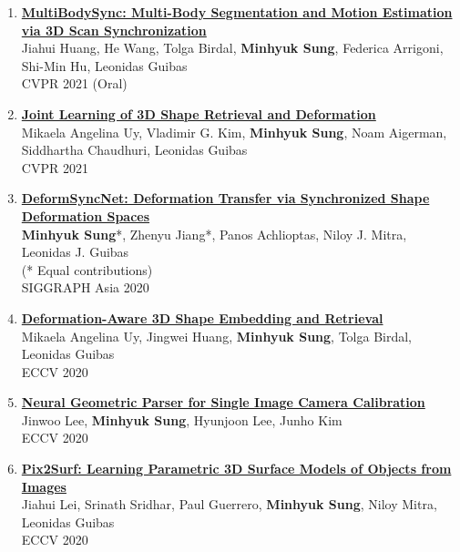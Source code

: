 \documentclass[letterpaper,10pt]{article} %
\newcommand{\blankline}{\quad\pagebreak[2]}
\begin{document}
{\begin{enumerate}
\item \label{cvpr21_2}
\href{https://cg.cs.tsinghua.edu.cn/people/~huangjh/publication/multibodysync/}{\textbf{MultiBodySync: Multi-Body Segmentation and Motion Estimation via 3D Scan Synchronization}}\\
Jiahui Huang, He Wang, Tolga Birdal, \textbf{Minhyuk Sung}, Federica Arrigoni, Shi-Min Hu, Leonidas Guibas\\
CVPR 2021 (Oral)\\
\blankline

\item \label{cvpr21_1}
\href{https://joint-retrieval-deformation.github.io/}{\textbf{Joint Learning of 3D Shape Retrieval and Deformation}}\\
Mikaela Angelina Uy, Vladimir G. Kim, \textbf{Minhyuk Sung}, Noam Aigerman, Siddhartha Chaudhuri, Leonidas Guibas\\
CVPR 2021\\
\blankline

\item \label{siggraphasia20}
\href{https://mhsung.github.io/papers/deform-sync-net.html}{\textbf{DeformSyncNet: Deformation Transfer via Synchronized Shape Deformation Spaces}}\\
\textbf{Minhyuk Sung}*, Zhenyu Jiang*, Panos Achlioptas, Niloy J. Mitra, Leonidas J. Guibas\\
(* Equal contributions)\\
SIGGRAPH Asia 2020\\
\blankline

\item \label{eccv20_4}
\href{https://deformscan2cad.github.io/}{\textbf{Deformation-Aware 3D Shape Embedding and Retrieval}}\\
Mikaela Angelina Uy, Jingwei Huang, \textbf{Minhyuk Sung}, Tolga Birdal, Leonidas Guibas\\
ECCV 2020\\
\blankline

\item \label{eccv20_3}
\href{https://arxiv.org/abs/2007.11855}{\textbf{Neural Geometric Parser for Single Image Camera Calibration}}\\
Jinwoo Lee, \textbf{Minhyuk Sung}, Hyunjoon Lee, Junho Kim\\
ECCV 2020\\
\blankline

\item \label{eccv20_2}
\href{https://geometry.stanford.edu/projects/pix2surf/}{\textbf{Pix2Surf: Learning Parametric 3D Surface Models of Objects from Images}}\\
Jiahui Lei, Srinath Sridhar, Paul Guerrero, \textbf{Minhyuk Sung}, Niloy Mitra, Leonidas Guibas\\
ECCV 2020\\
\blankline


\end{enumerate}}
\end{document}
